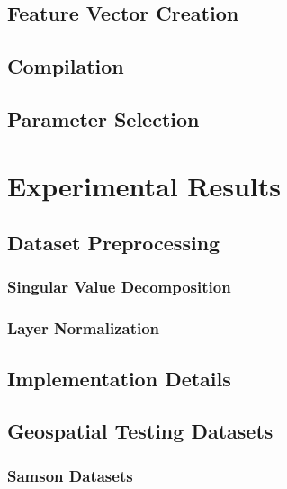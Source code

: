 \documentclass[10pt]{article}
\begin{document}
\subsection{Feature Vector Creation}\label{Algorithm FV}

\subsection{Compilation}\label{Compilation}

\subsection{Parameter Selection}\label{Parameters}


\clearpage
% 
% 
% 
% 
% 
\section{Experimental Results}

\subsection{Dataset Preprocessing} \label{Algorithm Preprocessing}

\subsubsection{Singular Value Decomposition} \label{SVD}

\subsubsection{Layer Normalization} \label{Normalization}


\subsection{Implementation Details}

\clearpage
\subsection{Geospatial Testing Datasets}
\subsubsection{Samson Datasets}
\end{document}
